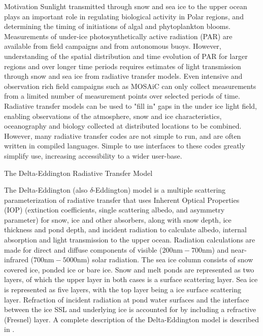 \documentclass[final]{beamer}
\newlength{\colwidth}
\begin{document}
\begin{frame}[t,fragile]
\begin{columns}[t]
\begin{column}{\colwidth}
\begin{block}{Motivation}
    Sunlight transmitted through snow and sea ice to the upper ocean
    plays an important role in regulating biological activity in Polar
    regions, and determining the timing of initiations of algal and
    phytoplankton blooms.  Measurements of under-ice
    photosynthetically active radiation (PAR) are available from field
    campaigns and from autonomous buoys. However, understanding of the
    spatial distribution and time evolution of PAR for larger regions
    and over longer time periods requires estimates of light
    transmission through snow and sea ice from radiative transfer
    models. Even intensive and observation rich field campaigns such
    as MOSAiC can only collect measurements from a limited number of
    measurement points over selected periods of time. Radiative
    transfer models can be used to "fill in" gaps in the under ice
    light field, enabling observations of the atmosphere, snow and ice
    characteristics, oceanography and biology collected at distributed
    locations to be combined.  However, many radiative transfer codes
    are not simple to run, and are often written in compiled
    languages.  Simple to use interfaces to these codes greatly
    simplify use, increasing accessibility to a wider user-base.

  \end{block}

  \begin{block}{The Delta-Eddington Radiative Transfer Model}

    The Delta-Eddington (also $\delta$-Eddington) model is a multiple
    scattering parameterization of radiative transfer that uses
    Inherent Optical Properties (IOP) (extinction coefficients, single
    scattering albedo, and asymmetry parameter) for snow, ice and
    other absorbers, along with snow depth, ice thickness and pond
    depth, and incident radiation to calculate albedo, internal
    absorption and light transmission to the upper ocean.  Radiation
    calculations are made for direct and diffuse components of visible
    ($200 \mathrm{nm} - 700 \mathrm{nm}$) and near-infrared ($700
    \mathrm{nm} - 5000 \mathrm{nm}$) solar radiation.  The sea ice
    column consists of snow covered ice, ponded ice or bare ice.  Snow
    and melt ponds are represented as two layers, of which the upper
    layer in both cases is a surface scattering layer.  Sea ice is
    represented as five layers, with the top layer being a ice surface
    scattering layer.  Refraction of incident radiation at pond water
    surfaces and the interface between the ice SSL and underlying ice
    is accounted for by including a refractive (Fresnel) layer.  A
    complete description of the Delta-Eddington model is described in
    \cite{briegleb_delta-eddington_2007}.
    

\end{block}
\end{column}
\end{columns}
\end{frame}
\end{document}
